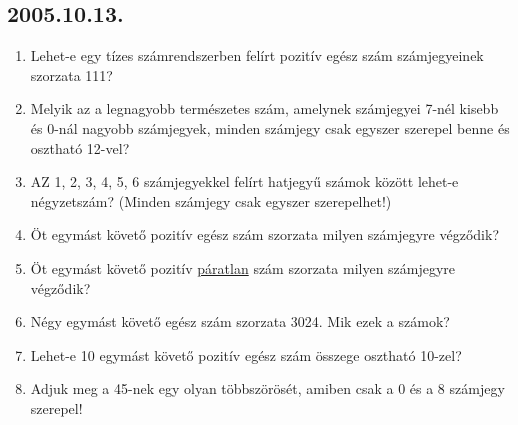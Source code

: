 \subsection*{2005.10.13.}
\begin{enumerate}
\item Lehet-e egy tízes számrendszerben felírt pozitív egész szám számjegyeinek szorzata 111?

\item Melyik az a legnagyobb természetes szám, amelynek számjegyei 7-nél kisebb és 0-nál nagyobb számjegyek, minden számjegy csak egyszer szerepel benne és osztható 12-vel?

\item AZ 1, 2, 3, 4, 5, 6 számjegyekkel felírt hatjegyű számok között lehet-e négyzetszám? (Minden számjegy csak egyszer szerepelhet!)

\item Öt egymást követő pozitív egész szám szorzata milyen számjegyre végződik?

\item Öt egymást követő pozitív \underline {páratlan} szám szorzata milyen számjegyre végződik?

\item Négy egymást követő egész szám szorzata 3024. Mik ezek a számok?

\item Lehet-e 10 egymást követő pozitív egész szám összege osztható 10-zel?

\item Adjuk meg a 45-nek egy olyan többszörösét, amiben csak a 0 és a 8 számjegy szerepel!
\end{enumerate}

